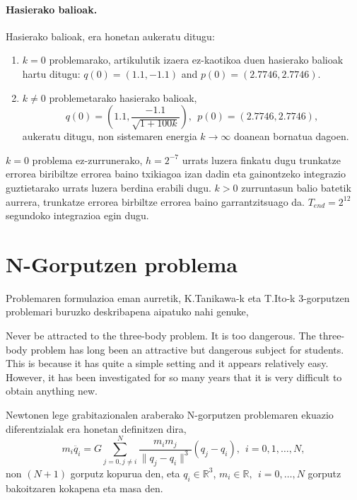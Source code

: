 \paragraph*{Hasierako balioak.}
Hasierako balioak, era honetan aukeratu ditugu:
\begin{enumerate}
\item  $k=0$ problemarako, \cite{Dumitru} artikulutik izaera ez-kaotikoa duen hasierako balioak hartu ditugu: $q(0)=(1.1, -1.1)$ and $p(0)=(2.7746,2.7746)$.

\item  $k\neq 0$ problemetarako hasierako balioak,
\begin{equation*}
q(0)=\left(1.1, \frac{-1.1}{\sqrt{1+100k}}\right), \ \ 
p(0)=(2.7746,2.7746),
\end{equation*}
aukeratu ditugu, non sistemaren energia $k \rightarrow \infty$ doanean bornatua dagoen.

\end{enumerate}

$k=0$ problema ez-zurrunerako, $h=2^{-7}$ urrats luzera finkatu dugu trunkatze errorea biribiltze errorea baino txikiagoa izan dadin  eta gainontzeko integrazio guztietarako urrats luzera berdina erabili dugu. $k>0$ zurruntasun balio batetik aurrera, trunkatze errorea birbiltze errorea baino garrantzitsuago da. $T_{end}=2^{12}$  segundoko integrazioa egin dugu. 

\section{N-Gorputzen problema}
\label{s:33}

Problemaren formulazioa eman aurretik, K.Tanikawa-k eta T.Ito-k \cite{Ito2007} 3-gorputzen problemari buruzko deskribapena aipatuko nahi genuke,

\begin{displayquote}
Never be attracted to the three-body problem. It is too dangerous. The three-body problem has long been an attractive but dangerous subject for students. This is because it has quite a simple setting and it appears relatively easy. However, it has been investigated for so many years that it is very difficult to obtain anything new.
\end{displayquote}

Newtonen lege grabitazionalen araberako N-gorputzen problemaren ekuazio diferentzialak era honetan definitzen dira,
\begin{equation}
m_i\ddot{q_i}= G \sum_{j=0,j \neq i}^{N} \frac{m_im_j}{\|q_j-q_i\|^3} (q_j-q_i) , \ \  i=0,1,\dots, N,
\end{equation}
non $(N+1)$ gorputz kopurua den, eta $q_i\in \mathbb{R}^3$, $m_i \in \mathbb{R}, \ \ i=0,\dots,N$ gorputz bakoitzaren kokapena eta masa den. 

